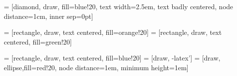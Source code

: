 

 = [diamond, draw, fill=blue!20, 
text width=2.5em, text badly centered, node distance=1cm, inner sep=0pt]

 = [rectangle, draw, text centered, fill=orange!20]
 = [rectangle, draw, text centered, fill=green!20]

 = [rectangle, draw, text centered, fill=blue!20]
 = [draw, -latex']
 = [draw, ellipse,fill=red!20, node distance=1em,
minimum height=1em]

\newlength{\figwidth}
\setlength{\figwidth}{4cm}

